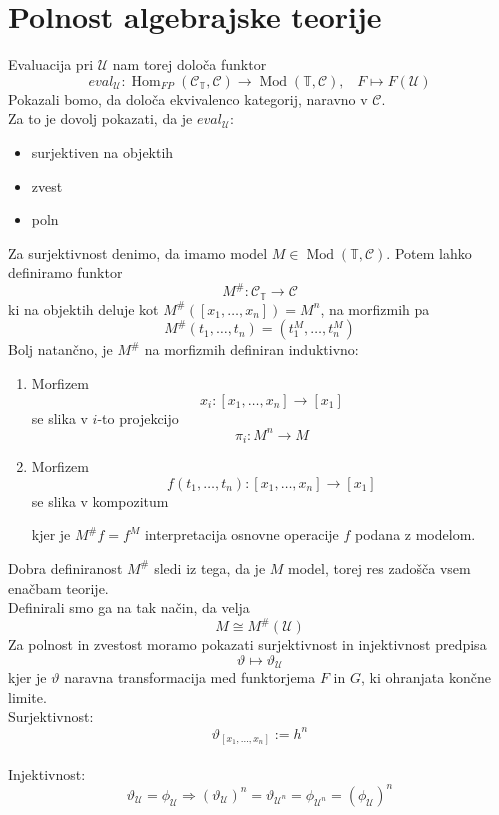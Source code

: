 \documentclass[12pt,a4paper]{book}
\theoremstyle{definition}
\theoremstyle{plain}
\theoremstyle{definition}
\theoremstyle{remark}
\DeclareMathOperator{\Hom}{Hom}
\DeclareMathOperator{\Mod}{Mod}
\begin{document}
\section{Polnost algebrajske teorije}
%
Evaluacija pri $\mathcal{U}$ nam torej določa funktor
$$eval_\mathcal{U} : \Hom_{FP}(\mathcal{C}_\mathbb{T}, \mathcal{C}) \to \Mod(\mathbb{T}, \mathcal{C}) \text{,} \quad F \mapsto F(\mathcal{U})$$
%
Pokazali bomo, da določa ekvivalenco kategorij, naravno v $\mathcal{C}$.\\
Za to je dovolj pokazati, da je $eval_\mathcal{U}$:
\begin{itemize}
\item surjektiven na objektih
\item zvest
\item poln
\end{itemize}
Za surjektivnost denimo, da imamo model $M \in \Mod(\mathbb{T}, \mathcal{C})$. Potem lahko definiramo funktor 
$$M^{\#} : \mathcal{C}_\mathbb{T} \to \mathcal{C}$$
ki na objektih deluje kot $M^{\#}([x_1, \ldots, x_n]) = M^n$, na morfizmih pa
$$M^{\#}(t_1, \ldots, t_n) = (t_1^M, \ldots, t_n^M)$$
%
%
Bolj natančno, je $M^{\#}$ na morfizmih definiran induktivno:
\begin{enumerate}
\item Morfizem $$x_i : [x_1, \ldots, x_n] \to [x_1]$$ se slika v $i$-to projekcijo $$\pi_i : M^n \to M$$
\item Morfizem $$f(t_1, \ldots, t_n) : [x_1, \ldots, x_n] \to [x_1]$$ se slika v kompozitum
\begin{center}
\end{center}
kjer je $M^{\#}f = f^M$ interpretacija osnovne operacije $f$ podana z modelom.
\end{enumerate}
%
Dobra definiranost $M^{\#}$ sledi iz tega, da je $M$ model, torej res zadošča vsem enačbam teorije.\\
Definirali smo ga na tak način, da velja
$$M \cong M^{\#}(\mathcal{U})$$
%
Za polnost in zvestost moramo pokazati surjektivnost in injektivnost predpisa $$\vartheta \mapsto \vartheta_\mathcal{U}$$
kjer je $\vartheta$ naravna transformacija med funktorjema $F$ in $G$, ki ohranjata končne limite.\\
Surjektivnost: $$\vartheta_{[x_1, \ldots, x_n]} := h^n$$\\
Injektivnost: $$\vartheta_\mathcal{U} = \phi_\mathcal{U} \Rightarrow (\vartheta_\mathcal{U})^n = \vartheta_{\mathcal{U}^n} = \phi_{\mathcal{U}^n} = (\phi_\mathcal{U})^n$$
\end{document}
